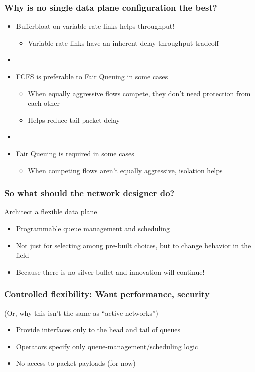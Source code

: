 \begin{frame}[plain]
\frametitle{Why is no single data plane configuration the best?}
\begin{itemize}
\item Bufferbloat on variable-rate links helps throughput!
      \begin{itemize}
      \item Variable-rate links have an inherent delay-throughput tradeoff
      \end{itemize} 

\item[] 

\item FCFS is preferable to Fair Queuing in some cases
      \begin{itemize}
      \item When equally aggressive flows compete, they don't need
        protection from each other
        \item Helps reduce tail packet delay
      \end{itemize}

\item[]

\item Fair Queuing is required in some cases
      \begin{itemize}      
      \item When competing flows aren't equally aggressive,
        isolation helps
      \end{itemize}
\end{itemize}
\end{frame}

\begin{frame}[plain]
\frametitle{So what should the network designer do?}
Architect a flexible data plane
\begin{itemize}
\item Programmable queue management and scheduling
\item Not just for selecting among pre-built choices, but to change
  behavior in the field
\item Because there is no silver bullet and innovation will continue!
\end{itemize}
\end{frame}

\begin{frame}[plain]
\frametitle{Controlled flexibility: Want performance, security}

(Or, why this isn't the same as ``active networks'')

\begin{itemize}
\item Provide interfaces only to the head and tail of queues
\item Operators specify only queue-management/scheduling logic
\item No access to packet payloads (for now)
\end{itemize}
\end{frame}

